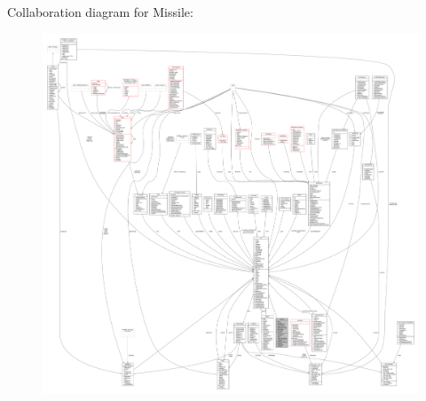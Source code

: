 Collaboration diagram for Missile\+:
\nopagebreak
\begin{figure}[H]
\begin{center}
\leavevmode
\includegraphics[width=350pt]{d7/d62/classMissile__coll__graph}
\end{center}
\end{figure}
